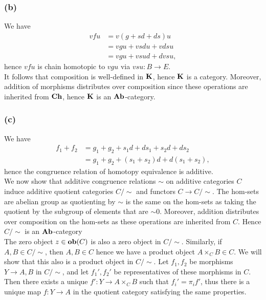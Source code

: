 \documentclass{article}
\theoremstyle{definition}
\newcommand{\catname}[1]{{\normalfont\textbf{#1}}}
\newcommand{\Ch}{\catname{Ch}}
\newcommand{\Ab}{\catname{Ab}}
\newcommand{\CK}{\catname{K}}
\newcommand{\ob}{\catname{ob}}
\begin{document}
\subsubsection*{(b)}

We have 
\begin{align*}
	vfu
	&=
	v(g + sd + ds)u \\
	&=
	vgu + vsdu + vdsu \\
	&=
	vgu + vsud + dvsu,
\end{align*}
hence $vfu$ is chain homotopic to $vgu$ via $vsu : B \to E$. \\

It follows that composition is well-defined in $\CK$, hence $\CK$ is a
category. Moreover, addition of morphisms distributes over composition since 
these operations are inherited from $\Ch$, hence $\CK$ is an $\Ab$-category.

\subsubsection*{(c)}

We have
\begin{align*}
	f_1 + f_2
	&=
	g_1 + g_2 + s_1d + ds_1 + s_2d + ds_2 \\
	&=
	g_1 + g_2 + (s_1 + s_2)d + d(s_1 + s_2),
\end{align*}
hence the congruence relation of homotopy equivalence is additive. \\

We now show that additive congruence relations $\sim$ on additive categories
$C$ induce additive quotient categories $C / \sim$ and functors $C \to C /
\sim$. The hom-sets are abelian group as quotienting by $\sim$ is the same on
the hom-sets as taking the quotient by the subgroup of elements that are $\sim
0$. Moreover, addition distributes over composition on the hom-sets as these
operations are inherited from $C$. Hence $C / \sim$ is an $\Ab$-category \\

The zero object $z \in \ob(C)$ is also a zero object in $C / \sim$.
Similarly, if $A, B \in C/ \sim$, then $A, B \in C$ hence we have a product
object $A \times_C B \in C$. We will show that this also is a product object in
$C / \sim$. Let $f_1, f_2$ be morphisms $Y \to A, B$ in $C / \sim$, and let
$f_1', f_2'$ be representatives of these morphisms in $C$. Then there exists a
unique $f' : Y \to A \times_C B$ such that $f_i' = \pi_i f'$, thus there is a
unique map $f : Y \to A$ in the quotient category satisfying the same
properties. \\
\end{document}
